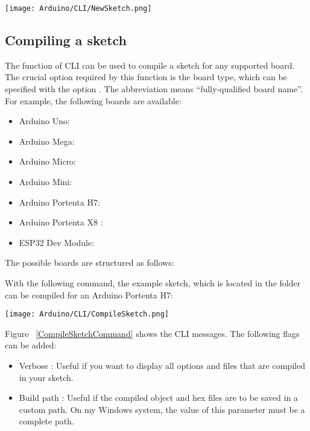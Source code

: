 	\begin{center}
		\texttt{[image: Arduino/CLI/NewSketch.png]}
		\label{NewSketch}
	\end{center}


\subsection{Compiling a sketch}
The function  of CLI can be used to compile a sketch for any supported board. The crucial option required by this function is the board type, which can be specified with the option . The abbreviation  means ``fully-qualified board name''. For example, the following boards are available:

\begin{itemize}
	\item Arduino Uno: 
	\item Arduino Mega: 
	\item Arduino Micro:  
	\item Arduino Mini: 
	\item Arduino Portenta H7: 
	\item Arduino Portenta X8 : 
	\item ESP32 Dev Module: 
\end{itemize}

The possible boards are structured as follows: 


With the following command, the example sketch, which is located in the folder  can be compiled for an Arduino Portenta H7: 

\medskip

	\begin{center}
		\texttt{[image: Arduino/CLI/CompileSketch.png]}
		\label{CompileSketchCommand}
	\end{center}

Figure ~\ref{CompileSketchCommand} shows the CLI messages. The following flags can be added:

\begin{itemize}
	\item Verbose : Useful if you want to display all options and files that are compiled in your sketch.
	\item Build path : Useful if the compiled object and hex files are to be saved in a custom path. On my Windows system, the value of this parameter must be a complete path.
\end{itemize}


